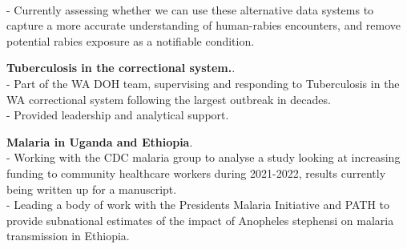 \documentclass[11pt,a4paper,]{awesome-cv}
\begin{document}
\begin{cventries}
{\begin{cvitems}
    \\ - Currently assessing whether we can use these alternative data systems to capture a more accurate understanding of human-rabies encounters, and remove potential rabies exposure as a notifiable condition.
\item \textbf{Tuberculosis in the correctional system.}.
    \\ - Part of the WA DOH team, supervising and responding to Tuberculosis in the WA correctional system following the largest outbreak in decades.
\\ - Provided leadership and analytical support.
\item \textbf{Malaria in Uganda and Ethiopia}.
    \\ - Working with the CDC malaria group to analyse a study looking at increasing funding to community healthcare workers during 2021-2022, results currently being written up for a manuscript.
    \\ - Leading a body of work with the Presidents Malaria Initiative and PATH to provide subnational estimates of the impact of Anopheles stephensi on malaria transmission in Ethiopia.
\end{cvitems}}
\end{cventries}
\end{document}
